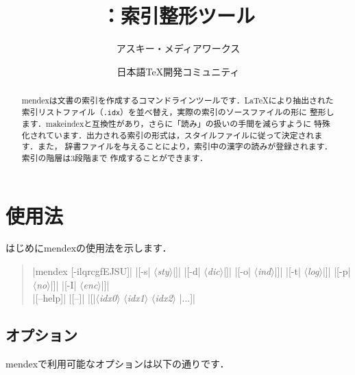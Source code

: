 \documentclass[a4paper]{jsarticle}
\title{\SoftName{mendex}：索引整形ツール}
\author{アスキー・メディアワークス \and 日本語\TeX 開発コミュニティ}
\newenvironment{syntax}{\begin{quote}\small}{\end{quote}}
\newcommand{\SoftName}[1]{\textsf{#1}}
\newcommand{\FileExtension}[1]{\texttt{.#1}}
\newcommand{\Meta}[1]{$\langle$\mbox{}\textit{#1}\mbox{}$\rangle$}
\begin{document}
\maketitle

\begin{abstract}
\SoftName{mendex}は文書の索引を作成するコマンドラインツールです．\LaTeX により抽出された
索引リストファイル（\FileExtension{idx}）を並べ替え，実際の索引のソースファイルの形に
整形します．\SoftName{makeindex}と互換性があり，さらに「読み」の扱いの手間を減らすように
特殊化されています．出力される索引の形式は，スタイルファイルに従って決定されます．また，
辞書ファイルを与えることにより，索引中の漢字の読みが登録されます．索引の階層は3段階まで
作成することができます．
\end{abstract}

\tableofcontents
\clearpage

\section{使用法}

はじめに\SoftName{mendex}の使用法を示します．
%
\begin{syntax}
|mendex [-ilqrcgfEJSU]|
|[-s| \Meta{sty}|]|
|[-d| \Meta{dic}|]|
|[-o| \Meta{ind}|]|
|[-t| \Meta{log}|]|
|[-p| \Meta{no}|]|
|[-I| \Meta{enc}|]| \\
%
|[--help]|
|[--]|
|[|\Meta{idx0} \Meta{idx1} \Meta{idx2} |...]|
\end{syntax}

\subsection{オプション}

\SoftName{mendex}で利用可能なオプションは以下の通りです．
\end{document}
